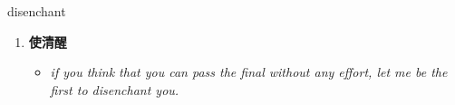 
\begin{frame}
{\huge disenchant}
\begin{center}
\begin{enumerate}\Large
  \item \textbf{使清醒}
  \begin{itemize}
    \item \em{\Large{if you think that you can pass the final without any effort, let me be the first to disenchant you.}}
  \end{itemize}
\end{enumerate}
\end{center}
\end{frame}
